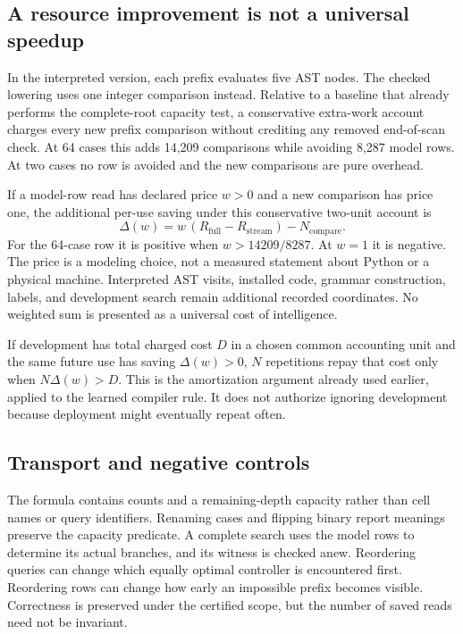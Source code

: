 \documentclass[11pt,letterpaper]{article}
\theoremstyle{plain}
\theoremstyle{definition}
\begin{document}
\subsection{A resource improvement is not a universal speedup}
In the interpreted version, each prefix evaluates five AST nodes. The checked lowering uses one integer comparison instead. Relative to a baseline that already performs the complete-root capacity test, a conservative extra-work account charges every new prefix comparison without crediting any removed end-of-scan check. At 64 cases this adds 14,209 comparisons while avoiding 8,287 model rows. At two cases no row is avoided and the new comparisons are pure overhead.

If a model-row read has declared price $w>0$ and a new comparison has price one, the additional per-use saving under this conservative two-unit account is
\[
\Delta(w)=w\,(R_{\mathrm{full}}-R_{\mathrm{stream}})-N_{\mathrm{compare}}.
\]
For the 64-case row it is positive when $w>14209/8287$. At $w=1$ it is negative. The price is a modeling choice, not a measured statement about Python or a physical machine. Interpreted AST visits, installed code, grammar construction, labels, and development search remain additional recorded coordinates. No weighted sum is presented as a universal cost of intelligence.

If development has total charged cost $D$ in a chosen common accounting unit and the same future use has saving $\Delta(w)>0$, $N$ repetitions repay that cost only when $N\Delta(w)>D$. This is the amortization argument already used earlier, applied to the learned compiler rule. It does not authorize ignoring development because deployment might eventually repeat often.

\subsection{Transport and negative controls}
The formula contains counts and a remaining-depth capacity rather than cell names or query identifiers. Renaming cases and flipping binary report meanings preserve the capacity predicate. A complete search uses the model rows to determine its actual branches, and its witness is checked anew. Reordering queries can change which equally optimal controller is encountered first. Reordering rows can change how early an impossible prefix becomes visible. Correctness is preserved under the certified scope, but the number of saved reads need not be invariant.
\end{document}
